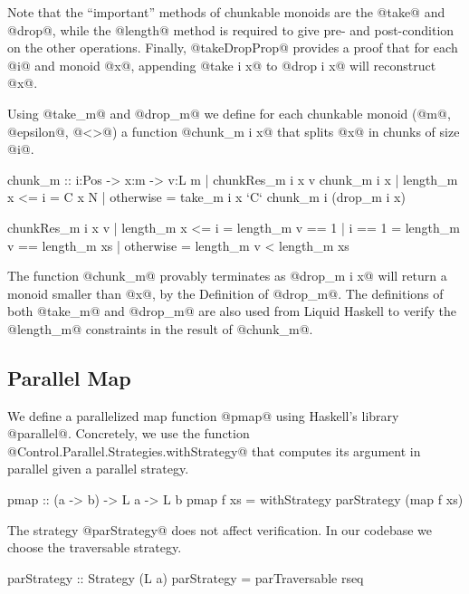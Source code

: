 Note that the ``important'' methods of chunkable monoids
are the @take@ and @drop@, while the @length@ method is required
to give pre- and post-condition on the other operations.
%
Finally, @takeDropProp@ provides a proof that
for each @i@ and monoid @x@, appending
@take i x@ to @drop i x@ will reconstruct @x@.

Using @take_m@ and @drop_m@ we define for each chunkable monoid
(@m@, @epsilon@, @<>@) a function @chunk_m i x@ that
splits @x@ in chunks of size @i@.
\begin{code}
  chunk_m :: i:Pos -> x:m -> {v:L m | chunkRes_m i x v}
  chunk_m i x
    | length_m x <= i = C x N
    | otherwise      = take_m i x `C` chunk_m i (drop_m i x)

  chunkRes_m i x v
    | length_m x <= i = length_m v == 1
    | i == 1         = length_m v == length_m xs
    | otherwise      = length_m v <  length_m xs
\end{code}

%
The function @chunk_m@ provably terminates as
@drop_m i x@
will return a monoid smaller than @x@,
by the Definition of @drop_m@.
%
The definitions of both @take_m@ and @drop_m@
are also used from Liquid Haskell to verify the
@length_m@ constraints in the result of @chunk_m@.


\subsection{Parallel Map}
We define a parallelized map function @pmap@
using Haskell's library @parallel@.
%
Concretely, we use the function
@Control.Parallel.Strategies.withStrategy@
that computes its argument in parallel given a parallel strategy.
\begin{code}
  pmap :: (a -> b) -> L a -> L b
  pmap f xs = withStrategy parStrategy (map f xs)
\end{code}
%
The strategy @parStrategy@ does not affect verification.
%
In our codebase we choose the traversable strategy.
\begin{code}
  parStrategy :: Strategy (L a)
  parStrategy = parTraversable rseq
\end{code}

